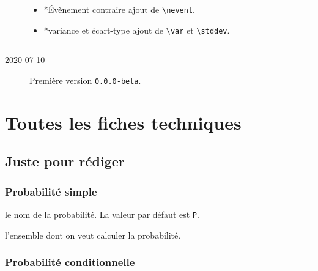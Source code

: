 \documentclass[12pt,a4paper]{article}
\makeatletter
\theoremstyle{definition}
\newcommand\topic{\@ifstar{\@topic@star}{\@topic@no@star}}
\newcommand\@topic@no@star[1]{%
    \textbf{\textsc{#1}.}%
}
\newcommand\@topic@star[1]{%
    \textbf{\textsc{#1} :}%
}
\newcommand\env[1]{\texttt{#1}}
\newcommand\macro[1]{\env{\textbackslash{}#1}}
\newcommand\separation{
    \medskip
    \hfill\rule{0.5\textwidth}{0.75pt}\hfill
    \medskip
}
\newcommand\extraspace{
    \vspace{0.25em}
}
\makeatother
\begin{document}
\begin{description}
\begin{itemize}[itemsep=.5em]
        \item \topic*{Évènement contraire}
              ajout de \macro{nevent}.
    
        \item \topic*{variance et écart-type}
              ajout de \macro{var} et \macro{stddev}.
    \end{itemize}
    
    \separation

    \medskip
    \item[2020-07-10] Première version \verb+0.0.0-beta+.

\end{description}


\newpage
\section{Toutes les fiches techniques} \label{techincal-ids}












\subsection{Juste pour rédiger}

\subsubsection{Probabilité \og simple \fg}




\IDoption{} le nom de la probabilité. La valeur par défaut est \verb#P#.

\IDarg{} l'ensemble dont on veut calculer la probabilité.




\subsubsection{Probabilité conditionnelle}





\extraspace
\end{document}
